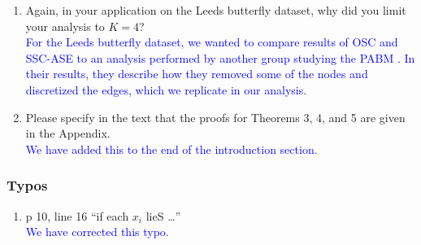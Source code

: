 \documentclass[
]{article}
\providecommand{\tightlist}{%
  \setlength{\itemsep}{0pt}\setlength{\parskip}{0pt}}
\begin{document}
\begin{enumerate}
{  Cursory numerical experiments suggest that OSC and SSC-ASE behave similarly for larger $K$ provided that $n$ is large enough. 
  }\\
  \textcolor{blue}{
  Regarding computational complexity, because both OSC and SSC-ASE may have an arbitrary final processing step, we will focus on the complexity in constructing the affinity matrix $B$. 
  For OSC, this involves spectral decomposition followed by matrix multiplication of $n \times K^2$ and $K^2 \times n$ matrices, so the complexity is $O(n^3 + n^2 K^2)$. 
  For SSC-ASE, we again start with spectral decomposition, followed by $n$ LASSO problems with a design matrix of size $K^2 \times (n - 1)$, so the complexity is $O(n^3 + n^2 K^4 + n K^6)$ \cite{10.1214/009053604000000067}. 
  SSC-A involves solving $n$ LASSO regression problems each with design matrices of size $n \times (n - 1)$, so the complexity here is $O(n^4)$. 
  When $n \gg K^2$, we can see that OSC and SSC-ASE are both $O(n^3)$. 
  In practice, we have found that $K$ does not affect runtimes too much. 
  }
\item
  Again, in your application on the Leeds butterfly dataset, why did you
  limit your analysis to \(K = 4\)?\\
  \textcolor{blue}{
  For the Leeds butterfly dataset, we wanted to compare results of OSC and SSC-ASE to an analysis performed by another group studying the PABM \citep{noroozi2019estimation}. 
  In their results, they describe how they removed some of the nodes and discretized the edges, which we replicate in our analysis. 
  }
\item
  Please specify in the text that the proofs for Theorems 3, 4, and 5
  are given in the Appendix.\\
  \textcolor{blue}{
  We have added this to the end of the introduction section.
  }
\end{enumerate}

\hypertarget{typos}{%
\subsubsection{Typos}\label{typos}}

\begin{enumerate}
\def\labelenumi{\arabic{enumi}.}
\tightlist
\item
  p 10, line 16 ``if each \(x_i\) lieS \ldots{}''\\
  \textcolor{blue}{
  We have corrected this typo. 
  }
\end{enumerate}
\end{document}
